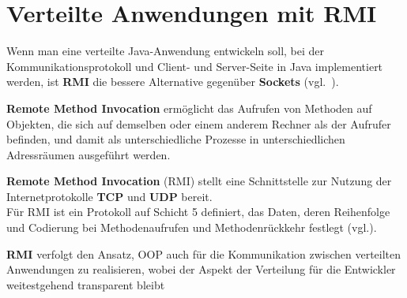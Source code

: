 \section{Verteilte Anwendungen mit RMI}\label{sec:distributedrmiapplications}

Wenn man eine verteilte Java-Anwendung entwickeln soll, bei der Kommunikationsprotokoll und Client- und Server-Seite in Java implementiert werden, ist \textbf{RMI} die bessere Alternative gegenüber  \textbf{Sockets} (vgl.~\cite[311]{Oec22}).

\begin{tcolorbox}[enlarge top by=0.5cm,enlarge bottom by=0.5cm]
    \textbf{Remote Method Invocation} ermöglicht das Aufrufen von Methoden auf Objekten, die sich auf demselben oder einem anderem Rechner als der Aufrufer befinden, und damit als unterschiedliche Prozesse in unterschiedlichen Adressräumen ausgeführt werden.
\end{tcolorbox}

\noindent
\textbf{Remote Method Invocation} (RMI) stellt eine Schnittstelle zur Nutzung der Internetprotokolle \textbf{TCP} und \textbf{UDP} bereit.\\
Für RMI ist ein Protokoll auf Schicht 5 definiert, das Daten, deren Reihenfolge und Codierung bei Methodenaufrufen und Methodenrückkehr festlegt (vgl.\cite[402]{Oec22}).

\noindent
\textbf{RMI} verfolgt den Ansatz, OOP auch für die Kommunikation zwischen verteilten Anwendungen zu realisieren, wobei der Aspekt der Verteilung für die Entwickler weitestgehend transparent bleibt

